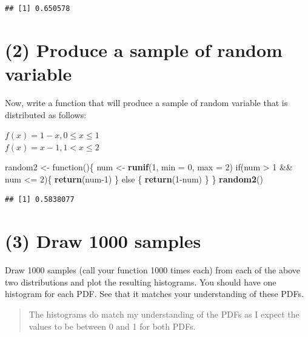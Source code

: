 \documentclass[]{article}
\newenvironment{Shaded}{\begin{snugshade}}{\end{snugshade}}
\newcommand{\KeywordTok}[1]{\textcolor[rgb]{0.13,0.29,0.53}{\textbf{{#1}}}}
\newcommand{\DataTypeTok}[1]{\textcolor[rgb]{0.13,0.29,0.53}{{#1}}}
\newcommand{\DecValTok}[1]{\textcolor[rgb]{0.00,0.00,0.81}{{#1}}}
\newcommand{\StringTok}[1]{\textcolor[rgb]{0.31,0.60,0.02}{{#1}}}
\newcommand{\NormalTok}[1]{{#1}}
\begin{document}
\begin{verbatim}
## [1] 0.650578
\end{verbatim}

\section{(2) Produce a sample of random
variable}\label{produce-a-sample-of-random-variable-1}

Now, write a function that will produce a sample of random variable that
is distributed as follows:

\(f(x) = 1 - x, 0 \leq x \leq 1\)\\
\(f(x) = x - 1, 1 < x \leq 2\)

\begin{Shaded}
\begin{Highlighting}[]
\NormalTok{random2 <-}\StringTok{ }\NormalTok{function()\{}
          \NormalTok{num <-}\StringTok{ }\KeywordTok{runif}\NormalTok{(}\DecValTok{1}\NormalTok{, }\DataTypeTok{min =} \DecValTok{0}\NormalTok{, }\DataTypeTok{max =} \DecValTok{2}\NormalTok{) }
          \NormalTok{if(num >}\StringTok{ }\DecValTok{1} \NormalTok{&&}\StringTok{ }\NormalTok{num <=}\StringTok{ }\DecValTok{2}\NormalTok{)\{}
             \KeywordTok{return}\NormalTok{(num}\DecValTok{-1}\NormalTok{)}
            \NormalTok{\} else \{}
              \KeywordTok{return}\NormalTok{(}\DecValTok{1}\NormalTok{-num)}
            \NormalTok{\}}
          \NormalTok{\} }
\KeywordTok{random2}\NormalTok{()}
\end{Highlighting}
\end{Shaded}

\begin{verbatim}
## [1] 0.5838077
\end{verbatim}

\newpage

\section{(3) Draw 1000 samples}\label{draw-1000-samples}

Draw 1000 samples (call your function 1000 times each) from each of the
above two distributions and plot the resulting histograms. You should
have one histogram for each PDF. See that it matches your understanding
of these PDFs.

\begin{quote}
The histograms do match my understanding of the PDFs as I expect the
values to be between 0 and 1 for both PDFs.
\end{quote}
\end{document}
